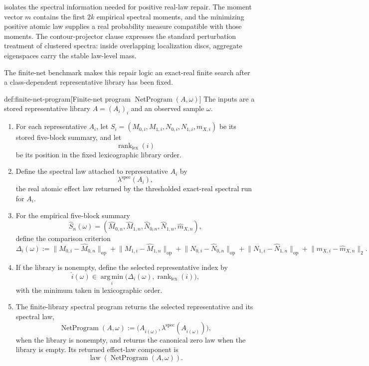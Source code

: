  isolates the spectral information needed for positive real-law repair. The moment vector \(m\) contains the first \(2k\) empirical spectral moments, and the minimizing positive atomic law supplies a real probability measure compatible with those moments. The contour-projector clause expresses the standard perturbation treatment of clustered spectra: inside overlapping localization discs, aggregate eigenspaces carry the stable law-level mass.

The finite-net benchmark makes this repair logic an exact-real finite search after a class-dependent representative library has been fixed.

\begin{algorithmv}{def:finite-net-program}[Finite-net program \(\operatorname{NetProgram}(A,\omega)\)]
The inputs are a stored representative library \(A=(A_i)_i\) and an observed sample \(\omega\).
\begin{enumerate}
\item For each representative \(A_i\), let \(S_i=(M_{0,i},M_{1,i},N_{0,i},N_{1,i},m_{X,i})\) be its stored five-block summary, and let
\[
\operatorname{rank}_{\mathrm{lex}}(i)
\]
be its position in the fixed lexicographic library order.

\item Define the spectral law attached to representative \(A_i\) by
\[
\lambda^{\mathrm{spec}}(A_i),
\]
the real atomic effect law returned by the thresholded exact-real spectral run for \(A_i\).

\item For the empirical five-block summary
\[
\widehat S_n(\omega)
=
(\widehat M_{0,n},\widehat M_{1,n},\widehat N_{0,n},\widehat N_{1,n},\widehat m_{X,n}),
\]
define the comparison criterion
\[
\Delta_i(\omega)
:=
\lVert M_{0,i}-\widehat M_{0,n}\rVert_{\mathrm{op}}
+
\lVert M_{1,i}-\widehat M_{1,n}\rVert_{\mathrm{op}}
+
\lVert N_{0,i}-\widehat N_{0,n}\rVert_{\mathrm{op}}
+
\lVert N_{1,i}-\widehat N_{1,n}\rVert_{\mathrm{op}}
+
\lVert m_{X,i}-\widehat m_{X,n}\rVert_2.
\]

\item If the library is nonempty, define the selected representative index by
\[
\widehat i(\omega)
\in
\operatorname*{arg\,min}_{i}
\bigl(\Delta_i(\omega),\operatorname{rank}_{\mathrm{lex}}(i)\bigr),
\]
with the minimum taken in lexicographic order.

\item The finite-library spectral program returns the selected representative and its spectral law,
\[
\operatorname{NetProgram}(A,\omega)
:=
\bigl(A_{\widehat i(\omega)},\lambda^{\mathrm{spec}}(A_{\widehat i(\omega)})\bigr),
\]
when the library is nonempty, and returns the canonical zero law when the library is empty. Its returned effect-law component is
\[
\operatorname{law}(\operatorname{NetProgram}(A,\omega)).
\]
\end{enumerate}
\end{algorithmv}

